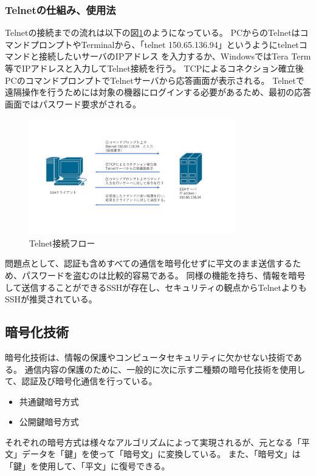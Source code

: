 \documentclass[12pt,a4paper,titlepage]{jsarticle}
\begin{document}
\subsubsection{Telnetの仕組み、使用法}
Telnetの接続までの流れは以下の図\ref{telnet_flow}のようになっている。
PCからのTelnetはコマンドプロンプトやTerminalから、「telnet 150.65.136.94」というようにtelnetコマンドと接続したいサーバのIPアドレス
を入力するか、WindowsではTera Term等でIPアドレスと入力してTelnet接続を行う。
TCPによるコネクション確立後PCのコマンドプロンプトでTelnetサーバから応答画面が表示される。
Telnetで遠隔操作を行うためには対象の機器にログインする必要があるため、最初の応答画面ではパスワード要求がされる。
\begin{figure}[H]
    \centering
    \includegraphics*[width=0.8\textwidth,page=1]{graphs/network_archtecture.pdf}
    \caption{Telnet接続フロー}
    \label{telnet_flow}
\end{figure}
問題点として、認証も含めすべての通信を暗号化せずに平文のまま送信するため、パスワードを盗むのは比較的容易である。
同様の機能を持ち、情報を暗号して送信することができるSSHが存在し、セキュリティの観点からTelnetよりもSSHが推奨されている。

\subsection{暗号化技術}
暗号化技術は、情報の保護やコンピュータセキュリティに欠かせない技術である。
通信内容の保護のために、一般的に次に示す二種類の暗号化技術を使用して、認証及び暗号化通信を行っている。
\begin{itemize}
    \item 共通鍵暗号方式
    \item 公開鍵暗号方式
\end{itemize}
それぞれの暗号方式は様々なアルゴリズムによって実現されるが、元となる「平文」データを「鍵」を使って「暗号文」に変換している。
また、「暗号文」は「鍵」を使用して、「平文」に復号できる。
\end{document}
